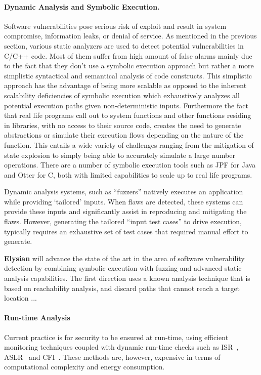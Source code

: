 \documentclass[a4paper,11pt]{article}
\newcommand{\project}[1]{\textbf{#1}\xspace}
\newcommand{\SECURITY}{\project{Elysian}}
\newcommand{\TheProject}{\SECURITY}
\begin{document}
\paragraph{Dynamic Analysis and Symbolic Execution.}
Software vulnerabilities pose serious risk of exploit and result in system compromise, information leaks, or denial of service. As mentioned in the previous section, various static analyzers are used to detect potential vulnerabilities in C/C++ code. Most of them suffer from high amount of false alarms mainly due to the fact that they don’t use a symbolic execution approach but rather a more simplistic syntactical and semantical analysis of code constructs. This simplistic approach has the advantage of being more scalable as opposed to the inherent scalability deficiencies of symbolic execution which exhaustively analyzes all potential execution paths given non-deterministic inputs. Furthermore the fact that real life programs call out to system functions and other functions residing in libraries, with no access to their source code, creates the need to generate abstractions or simulate their execution flows depending on the nature of the function. This entails a wide variety of challenges ranging from the mitigation of state explosion to simply being able to accurately simulate a large number operations. There are a number of symbolic execution tools such as JPF for Java and Otter for C, both with limited capabilities to scale up to real life programs.

Dynamic analysis systems, such as “fuzzers” natively executes an application while providing ‘tailored’ inputs. When flaws are detected, these systems can provide these inputs and significantly assist in reproducing and mitigating the flaws. However, generating the tailored “input test cases” to drive execution, typically requires an exhaustive set of test cases that required manual effort to generate. 

\begin{mdframed}[backgroundcolor=gray!10]
\TheProject{} will advance the state of the art in the area of software vulnerability detection by combining symbolic execution with fuzzing and advanced static analysis capabilities. The first direction uses a known analysis technique that is based on reachability analysis, and discard paths that cannot reach a target location ...

\end{mdframed}


\paragraph{Run-time Analysis}
Current practice is for security to be ensured at run-time, using efficient monitoring techniques coupled with dynamic run-time checks such as ISR~\cite{isr}, ASLR~\cite{aslr} and CFI~\cite{cfi}. These methods are, however, expensive in terms of computational complexity and energy consumption. 
\end{document}
